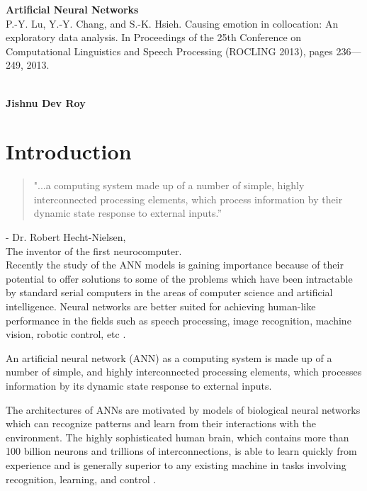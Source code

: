 \documentclass[a4paper, 12pt]{article}
\begin{document}
\noindent
\Huge\textbf{Artificial Neural Networks} \\  
\normalsize P.-Y. Lu, Y.-Y. Chang, and S.-K. Hsieh.  Causing emotion in collocation:  An exploratory data analysis. In Proceedings of the 25th Conference on Computational Linguistics and Speech Processing (ROCLING 2013), pages 236---249, 2013.
\\ \\
\begin{center}
	\textbf{Jishnu Dev Roy} \\
\end{center}




\section*{Introduction}
\begin{quote}
"...a computing system made up of a number of simple, highly interconnected processing elements, which process information by their dynamic state response to external inputs.”\end{quote}   - Dr. Robert Hecht-Nielsen,\\ The inventor of the first neurocomputer.\\

Recently the study of the ANN models is gaining importance because of their potential to offer solutions to some of the problems  which  have been intractable by standard serial computers in the areas of computer science and artificial intelligence.   Neural  networks are  better suited for achieving human-like  performance in the fields such as speech processing, image recognition,  machine  vision, robotic control, etc \cite{lee1992short}.

An artificial neural network (ANN) as a  computing system is made up of a  number of simple, and highly  interconnected  processing  elements,  which  processes  information by its dynamic state response to external  inputs.

The architectures of ANNs are motivated by models of biological neural networks which can recognize patterns and learn from their interactions with the environment. The highly sophisticated human brain, which contains more than 100 billion neurons and trillions of interconnections, is able to learn quickly from experience and is generally superior to any existing machine in tasks involving recognition, learning, and control \cite{hsu1995artificial}.
\end{document}
